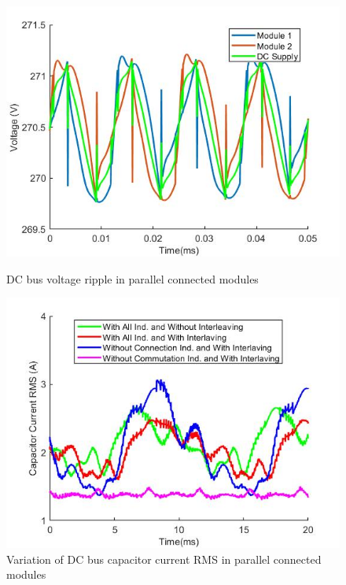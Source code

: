 \begin{figure}[tb]
  \includegraphics[width=\linewidth]{figures/parallel_volt_ripple.jpg}
  \caption{DC bus voltage ripple in parallel connected modules }\label{fig:parallel_volt_ripple}
\endminipage\hfill
{}
  \includegraphics[width=\linewidth]{figures/parallel_curr_rms.jpg}
  \caption{Variation of DC bus capacitor current RMS in parallel connected modules}\label{fig:parallel_curr_rms}
\endminipage
\end{figure}




